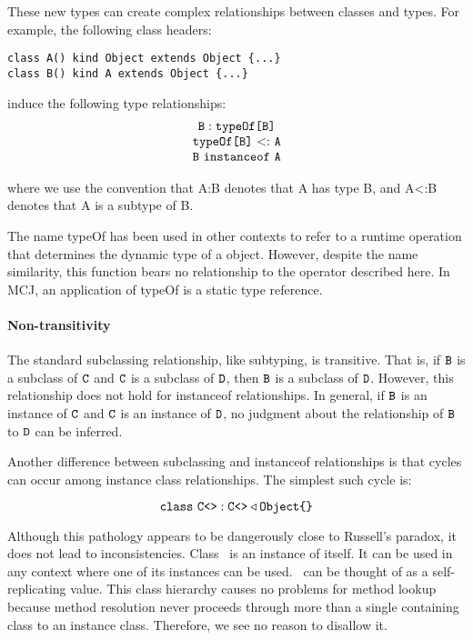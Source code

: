 \documentclass{acm-sigplan}
\begin{document}
These new types can create complex relationships between classes and types.  For
example, the following class headers:

\begin{verbatim}
class A() kind Object extends Object {...}
class B() kind A extends Object {...}
\end{verbatim}

induce the following type relationships:
\begin{displaymath}
\begin{array}{c}
\typ \B {\typeof \B} \\
\subtype {\typeof \B} \A \\
\B~ {\txt instanceof}\ \A
\end{array}
\end{displaymath}

\hspace{-.43cm}where we use the convention that {\txt A:B} denotes
that {\txt A} has type {\txt B}, and {\txt A<:B} denotes that {\txt A}
is a subtype of {\txt B}.

The name {\txt typeOf} has been used in other contexts to refer to a
runtime operation that determines the dynamic type of a object.
However, despite the name similarity, this function bears no
relationship to the operator described here.  In MCJ, an application
of {\txt typeOf} is a static type reference.

\paragraph{Non-transitivity}

The standard subclassing relationship, like subtyping, is transitive.
That is, if $\mbox {\tt B}$ is a subclass of $\mbox {\tt C}$ and $\mbox {\tt C}$ is a subclass of $\mbox {\tt D}$,
then $\mbox {\tt B}$ is a subclass of $\mbox {\tt D}$.  However, this relationship does not
hold for {\txt instanceof} relationships.  In general, if $\mbox {\tt B}$ is an
instance of $\mbox {\tt C}$ and $\mbox {\tt C}$ is an instance of $\mbox {\tt D}$, no judgment
about the relationship of $\mbox {\tt B}$ to $\mbox {\tt D}$ can be inferred.

Another difference between subclassing and {\txt instanceof}
relationships is that cycles can occur among instance class
relationships. The simplest such cycle is:

\begin{displaymath}
\mbox{\tt class}\ {\mbox {\tt C}}\mbox{\tt <}\mbox{\tt >} : {\mbox {\tt C}}\mbox{\tt <}\mbox{\tt >} \triangleleft \mbox{\tt Object} \mbox{\tt \{}\mbox{\tt \}}
\end{displaymath}

Although this pathology appears to be dangerously close to Russell's
paradox, it does not lead to inconsistencies.  Class \C\ is an
instance of itself. It can be used in any context where one of its
instances can be used.  \C\ can be thought of as a self-replicating
value. This class hierarchy causes no problems for method lookup
because method resolution never proceeds through more than a single
containing class to an instance class. Therefore, we see no reason to
disallow it.
\end{document}
